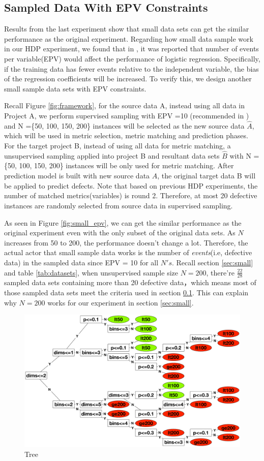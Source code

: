 \subsection{Sampled Data With EPV Constraints}
\label{sec:EPV}
 Results from the last experiment show that small data sets can get the similar performance as the original experiment. Regarding how small data sample work in our HDP experiment,  we found that in \cite{peduzzi1996simulation}, it was reported that number of events per variable(EPV) would affect the performance of logistic regression. Specifically, if the training data has fewer events relative to the independent variable, the bias of the regression coefficients will be increased. To verify this, we design another small sample data sets with EPV constraints.

Recall Figure \ref{fig:framework}, for the source data A, instead using all data in Project A, we perform supervised sampling with EPV =10 (recommended in \cite{peduzzi1996simulation})  and N =\{50, 100, 150, 200\} instances will be selected as the new source data ${\hat A}$, which will be used in metric selection, metric matching and prediction phases. For the target project B, instead of using all data for metric matching, a unsupervised sampling applied into project B and resultant data sets ${\hat B}$ with N = \{50, 100, 150, 200\} instances will be only used for metric matching. After prediction model is built with new source data $\hat A$, the original target data B will be applied to predict defects. Note that based on previous HDP experiments, the number of matched metrics(variables) is round 2. Therefore, at most 20 defective instances are randomly selected from source data in supervised sampling.

As seen in Figure \ref{fig:small_epv}, we can get the similar performance as the original experiment even with the only subset of the original data sets. As $N$ increases from 50 to 200, the performance doesn't change a lot. Therefore, the actual actor that small sample data works is the number of {\it events}(i.e, defective data) in the sampled data since EPV = 10 for all $N's$. Recall section \ref{sec:small} and table \ref{tab:datasets}, when unsupervised sample size $N=200$, there're $\frac{22}{28}$ sampled data sets containing more than 20 defective data，which means most of those sampled data sets meet the criteria used in section \ref{sec:EPV}. This can explain why $N=200$ works for our experiment in section \ref{sec:small}.


\begin{figure}[!htp]
	\centering
	\includegraphics[width=0.7\linewidth]{Figures/raleigh/tree.eps}
	\caption{Tree}
	\label{fig:tree}
\end{figure}


